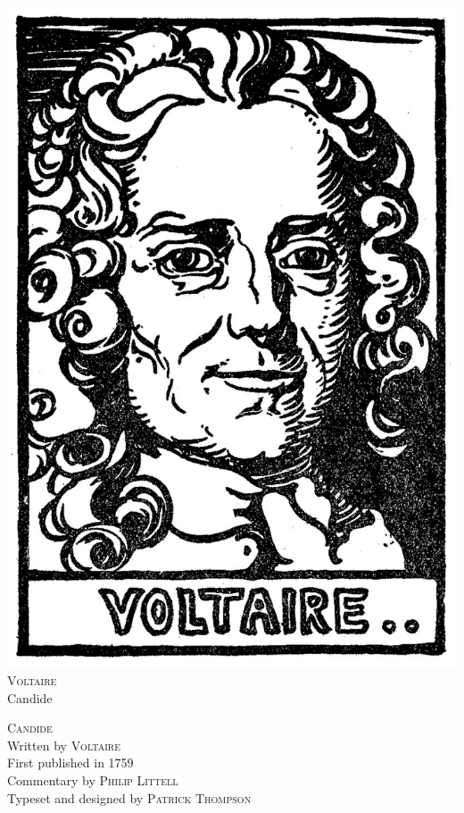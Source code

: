 \documentclass[a5paper,openany,11pt]{memoir}
\begin{document}
\thispagestyle{empty}
\begin{center}
\vspace*{3cm}
\includegraphics[scale=0.6]{001.jpg}\\
\vspace*{3cm}
\textsc{Voltaire}\\
\vspace*{.5cm}
{\Huge Candide}\\
\end{center}
\newpage
\thispagestyle{empty}
\phantom{bottom}
\vfill
\textsc{Candide}\\
Written by \textsc{Voltaire} \\
First published in 1759 \\
Commentary by \textsc{Philip Littell} \\
Typeset and designed by \textsc{Patrick Thompson} \\
\end{document}

